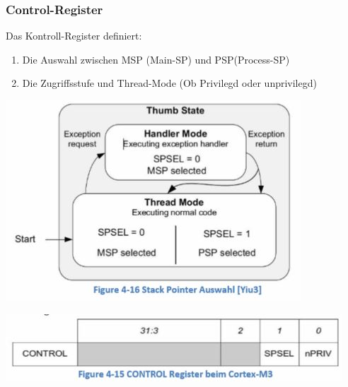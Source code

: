 \subsubsection{Control-Register}
Das Kontroll-Register definiert:
\begin{enumerate}
    \item Die Auswahl zwischen MSP (Main-SP) und PSP(Process-SP)
    \item Die Zugriffsstufe und Thread-Mode
    \subitem (Ob Privilegd oder unprivilegd)
    \end{enumerate}
    \begin{multicols}{2}
    \includegraphics[width=\linewidth]{images/StackPointerAuswahl}
    
         \includegraphics[width=\linewidth]{images/controlRegister}
             \end{multicols}